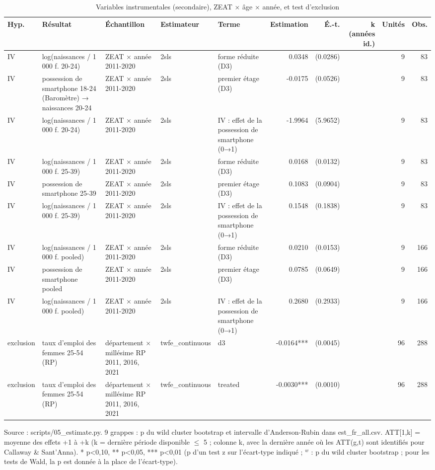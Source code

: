 \begin{table}\centering
\begin{threeparttable}
\caption{Variables instrumentales (secondaire), ZEAT × âge × année, et test d'exclusion}\label{tab:iv}
\scriptsize
\begin{tabular}{lp{4.7cm}p{4.0cm}lp{4.1cm}rrrrr}
\toprule
Hyp. & Résultat & Échantillon & Estimateur & Terme & Estimation & É.-t. & k (années id.) & Unités & Obs. \\
\midrule
IV & log(naissances / 1 000 f. 20-24) & ZEAT × année 2011-2020 & 2sls & forme réduite (D3) & 0.0348 & (0.0286) &  & 9 & 83 \\
IV & possession de smartphone 18-24 (Baromètre) → naissances 20-24 & ZEAT × année 2011-2020 & 2sls & premier étage (D3) & -0.0175 & (0.0526) &  & 9 & 83 \\
IV & log(naissances / 1 000 f. 20-24) & ZEAT × année 2011-2020 & 2sls & IV : effet de la possession de smartphone (0→1) & -1.9964 & (5.9652) &  & 9 & 83 \\
IV & log(naissances / 1 000 f. 25-39) & ZEAT × année 2011-2020 & 2sls & forme réduite (D3) & 0.0168 & (0.0132) &  & 9 & 83 \\
IV & possession de smartphone 25-39 & ZEAT × année 2011-2020 & 2sls & premier étage (D3) & 0.1083 & (0.0904) &  & 9 & 83 \\
IV & log(naissances / 1 000 f. 25-39) & ZEAT × année 2011-2020 & 2sls & IV : effet de la possession de smartphone (0→1) & 0.1548 & (0.1838) &  & 9 & 83 \\
IV & log(naissances / 1 000 f. pooled) & ZEAT × année 2011-2020 & 2sls & forme réduite (D3) & 0.0210 & (0.0153) &  & 9 & 166 \\
IV & possession de smartphone pooled & ZEAT × année 2011-2020 & 2sls & premier étage (D3) & 0.0785 & (0.0649) &  & 9 & 166 \\
IV & log(naissances / 1 000 f. pooled) & ZEAT × année 2011-2020 & 2sls & IV : effet de la possession de smartphone (0→1) & 0.2680 & (0.2933) &  & 9 & 166 \\
exclusion & taux d'emploi des femmes 25-54 (RP) & département × millésime RP 2011, 2016, 2021 & twfe\_continuous & d3 & -0.0164*** & (0.0045) &  & 96 & 288 \\
exclusion & taux d'emploi des femmes 25-54 (RP) & département × millésime RP 2011, 2016, 2021 & twfe\_continuous & treated & -0.0030*** & (0.0010) &  & 96 & 288 \\
\bottomrule
\end{tabular}
\begin{tablenotes}\footnotesize
\item Source : scripts/05\_estimate.py. 9 grappes : p du wild cluster bootstrap et intervalle d'Anderson-Rubin dans est\_fr\_all.csv. ATT[1,k] = moyenne des effets +1 à +k (k = dernière période disponible $\leq$ 5 ; colonne k, avec la dernière année où les ATT(g,t) sont identifiés pour Callaway \& Sant'Anna). * p<0,10, ** p<0,05, *** p<0,01 (p d'un test z sur l'écart-type indiqué ; $^{w}$ : p du wild cluster bootstrap ; pour les tests de Wald, la p est donnée à la place de l'écart-type).
\end{tablenotes}
\end{threeparttable}
\end{table}
